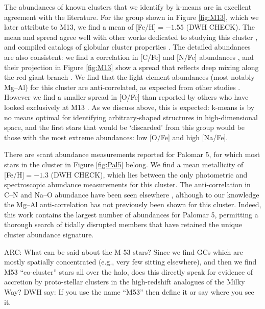 \documentclass[12pt, letterpaper, preprint]{aastex}
\begin{document}
The abundances of known clusters that we identify by k-means are in
excellent agreement with the literature. For the group shown in Figure \ref{fig:M13},
which we later attribute to M13, we find a mean of [Fe/H]$ = -1.55$ (DWH CHECK).
The mean and spread agree well with other works dedicated to studying this cluster
\citep{Kraft_1992,Cohen_Melendez_2005,Johnson_Pilachowski_2012}, and compiled catalogs of
globular cluster properties \citep{Harris}. The detailed abundances are also
consistent: we find a correlation in [C/Fe] and [N/Fe] abundances \citep{Smith_2005}, and their
projection in Figure \ref{fig:M13} show a spread that reflects deep mixing
along the red giant branch \citep{Briley_2004}. We find that the light element
abundances (most notably Mg--Al) for this cluster are anti-correlated, as
expected from other studies \citep[e.g.,][]{gratton}. However we find a
smaller spread in [O/Fe] than reported by others who have looked exclusively
at M13 \citep{Johnson_Pilachowski_2012}.  As we discuss above, this is expected:
k-means is by no means optimal for identifying arbitrary-shaped structures
in high-dimensional space, and the first stars that would be `discarded' from
this group would be those with the most extreme abundances: low [O/Fe] and
high [Na/Fe].


There are scant abundance measurements reported for Palomar 5, for which
most stars in the cluster in Figure \ref{fig:Pal5} belong. We find a mean
metallicity of [Fe/H]$ = -1.3$ (DWH CHECK), which lies between the only
photometric \citep{Geisler_1997} and spectroscopic \citep{Smith_1985,Smith_2002} abundance
measurements for this cluster.  The anti-correlation in C--N and Na--O abundance
have been seen elsewhere \citep[][respectively]{Smith_1985,Smith_2002}, although
to our knowledge the Mg--Al anti-correlation has not previously been shown for this cluster.
Indeed, this work contains the largest number of abundances for Palomar 5,
permitting a thorough search of tidally disrupted members \citep[e.g.,][]{Kuzma_2015} 
that have retained the unique cluster abundance signature.





ARC: What can be said about the M 53 stars? Since we find GCs which are
	mostly spatially concentrated (e.g., very few sitting elsewhere),
	and then we find M53 ``co-cluster'' stars all over the halo, does this
	directly speak for evidence of accretion by proto-stellar clusters
	in the high-redshift analogues of the Milky Way?  DWH say: If you use the name ``M53'' then define it or say where you see it.
	
\end{document}
